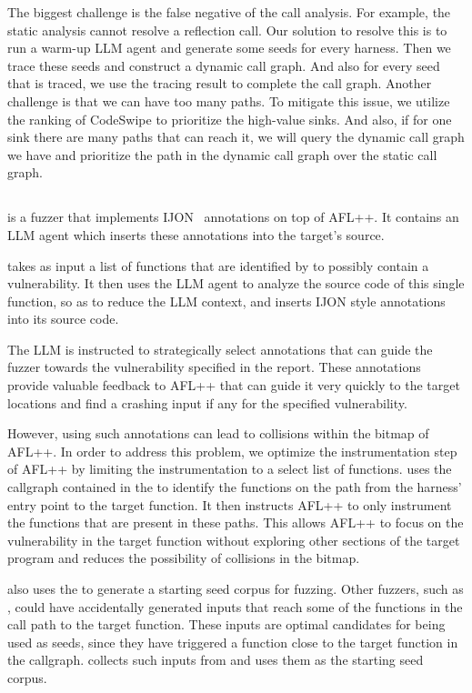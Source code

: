 The biggest challenge is the false negative of the call analysis.
For example, the static analysis cannot resolve a reflection call.
Our solution to resolve this is to run a warm-up LLM agent and generate some seeds for every harness.
Then we trace these seeds and construct a dynamic call graph.
And also for every seed that is traced, we use the tracing result to complete the call graph.
Another challenge is that we can have too many paths.
To mitigate this issue, we utilize the ranking of CodeSwipe to prioritize the high-value sinks.
And also, if for one sink there are many paths that can reach it, we will query the dynamic call graph we have and prioritize the path in the dynamic call graph over the static call graph.

\subsection{\aijon}
\label{aijon}

\aijon is a fuzzer that implements IJON~\cite{aschermann2020ijon} annotations on top of AFL++.
It contains an LLM agent which inserts these annotations into the target's source.

\aijon takes as input a list of functions that are identified by \codeswipe to possibly contain a vulnerability.
It then uses the LLM agent to analyze the source code of this single function, so as to reduce the LLM context, and inserts IJON style annotations into its source code.

The LLM is instructed to strategically select annotations that can guide the fuzzer towards the vulnerability specified in the \codeswipe report.
These annotations provide valuable feedback to AFL++ that can guide it very quickly to the target locations and find a crashing input if any for the specified vulnerability.

However, using such annotations can lead to collisions within the bitmap of AFL++.
In order to address this problem, we optimize the instrumentation step of AFL++ by limiting the instrumentation to a select list of functions.
\aijon uses the callgraph contained in the \analysisgraph to identify the functions on the path from the harness' entry point to the target function.
It then instructs AFL++ to only instrument the functions that are present in these paths.
This allows AFL++ to focus on the vulnerability in the target function without exploring other sections of the target program and reduces the possibility of collisions in the bitmap.

\aijon also uses the \analysisgraph to generate a starting seed corpus for fuzzing.
Other fuzzers, such as \afluzzer, could have accidentally generated inputs that reach some of the functions in the call path to the target function.
These inputs are optimal candidates for being used as seeds, since they have triggered a function close to the target function in the callgraph.
\aijon collects such inputs from \analysisgraph and uses them as the starting seed corpus.

